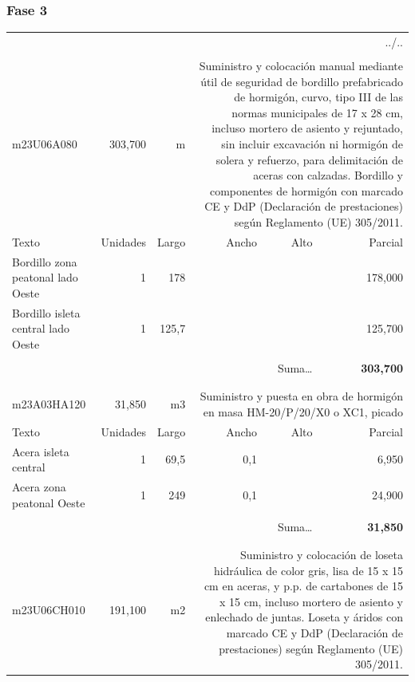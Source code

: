 \documentclass{book}%
\begin{document}
%
\subsubsection{Fase 3}%
\begin{longtable}{lrrrrr}%
\multicolumn{6}{r}{../..}\\%
\endfoot%
\endlastfoot%
&&&&&\\%
m23U06A080&   303,700& m&\multicolumn{3}{p{6cm}}{\scriptsize Suministro y colocación manual mediante útil de seguridad de bordillo prefabricado de hormigón, curvo, tipo III de las normas municipales de 17 x 28 cm, incluso mortero de asiento y rejuntado, sin incluir excavación ni hormigón de solera y refuerzo, para delimitación de aceras con calzadas. Bordillo y componentes de hormigón con marcado CE y DdP (Declaración de prestaciones) según Reglamento (UE) 305/2011.\normalsize}\\%
Texto&Unidades&Largo&Ancho&Alto&Parcial\\%
\hline%
\multicolumn{1}{p{3.5cm}}{Bordillo  zona peatonal lado Oeste}&1&178&&&   178,000\\%
\multicolumn{1}{p{3.5cm}}{Bordillo  isleta central lado Oeste}&1&125,7&&&   125,700\\%
&&&&&\\%
\multicolumn{5}{r}{Suma\ldots}&\textbf{   303,700}\\%
\hline%
&&&&&\\%
&&&&&\\%
m23A03HA120&    31,850& m3&\multicolumn{3}{p{6cm}}{\scriptsize Suministro y puesta en obra de hormigón en masa HM-20/P/20/X0 o XC1, picado\normalsize}\\%
Texto&Unidades&Largo&Ancho&Alto&Parcial\\%
\hline%
\multicolumn{1}{p{3.5cm}}{Acera isleta central}&1&69,5&0,1&&     6,950\\%
\multicolumn{1}{p{3.5cm}}{Acera zona peatonal Oeste}&1&249&0,1&&    24,900\\%
&&&&&\\%
\multicolumn{5}{r}{Suma\ldots}&\textbf{    31,850}\\%
\hline%
&&&&&\\%
&&&&&\\%
m23U06CH010&   191,100& m2&\multicolumn{3}{p{6cm}}{\scriptsize Suministro y colocación de loseta hidráulica de color gris, lisa de 15 x 15 cm en aceras, y p.p. de cartabones de 15 x 15 cm, incluso mortero de asiento y enlechado de juntas. Loseta y áridos con marcado CE y DdP (Declaración de prestaciones) según Reglamento (UE) 305/2011.\normalsize}\\%

\end{longtable}
\end{document}
